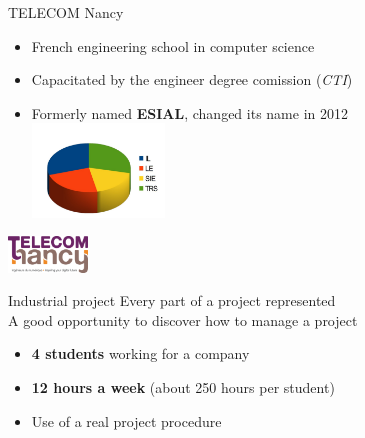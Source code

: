 \documentclass[12pt]{beamer}
\begin{document}
\begin{frame}{TELECOM Nancy}
    \begin{itemize}[<+->]
	\item French engineering school in computer science\\
	\vfill
	\item Capacitated by the engineer degree comission (\emph{CTI})\\
	\vfill
	\item Formerly named \textbf{ESIAL}, changed its name in 2012\\
	\vfill
	\includegraphics[width=100pt]{img/promo.jpg}
    \end{itemize}
    \hfill
    \includegraphics[width=60pt]{img/telecom-nancy.jpg}
\end{frame}



\begin{frame}{Industrial project}
    Every part of a project represented\\
    \vfill
    A good opportunity to discover how to manage a project
    \vfill
    \begin{itemize}
	\item \textbf{4 students} working for a company
	\item \textbf{12 hours a week} (about 250 hours per student)
	\item Use of a real project procedure
    \end{itemize}
\end{frame}
\end{document}
